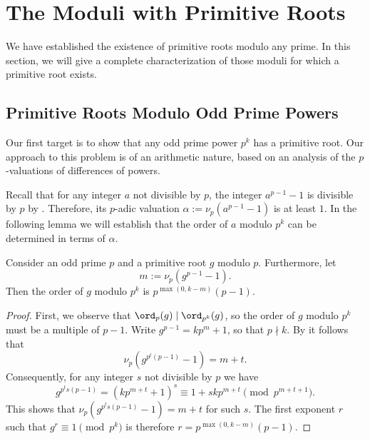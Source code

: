 \chapter{The Moduli with Primitive Roots}

We have established the existence of primitive roots modulo any prime. In this section, we will give a complete characterization of those moduli for which a primitive root exists.

\section{Primitive Roots Modulo Odd Prime Powers}
Our first target is to show that any odd prime power $p^k$ has a primitive root. Our approach to this problem is of an arithmetic nature, based on an analysis of the $p$-valuations of differences of powers.

Recall that for any integer $a$ not divisible by $p$, the integer $a^{p-1}-1$ is divisible by $p$ by . Therefore, its $p$-adic valuation $\alpha:=\nu_p(a^{p-1}-1)$ is at least $1$. In the following lemma we will establish that the order of $a$ modulo $p^k$ can be determined in terms of $\alpha$.

\begin{lemma}\label{lemma:order-modulo-prime-power-primitive-root}
  Consider an odd prime $p$ and a primitive root $g$ modulo $p$. Furthermore, let
  \begin{equation*}
    m:=\nu_p(g^{p-1}-1).
  \end{equation*}
  Then the order of $g$ modulo $p^k$ is $p^{\max(0,k-m)}(p-1)$. 
\end{lemma}

\begin{proof}
  First, we observe that $\ord_p(g)\mid \ord_{p^k}(g)$, so the order of $g$ modulo $p^k$ must be a multiple of $p-1$. Write $g^{p-1}=kp^{m}+1$, so that $p\nmid k$. By  it follows that
  \begin{equation*}
    \nu_p(g^{p^t(p-1)}-1)=m+t.
  \end{equation*}
  Consequently, for any integer $s$ not divisible by $p$ we have
  \begin{equation*}
    g^{p^ts(p-1)}=(kp^{m+t}+1)^s\equiv 1+skp^{m+t}\pmod{p^{m+t+1}}.
  \end{equation*}
  This shows that $\nu_p(g^{p^ts(p-1)}-1)=m+t$ for such $s$. The first exponent $r$ such that $g^r\equiv 1\pmod{p^k}$ is therefore $r=p^{\max(0,k-m)}(p-1)$.
\end{proof}

